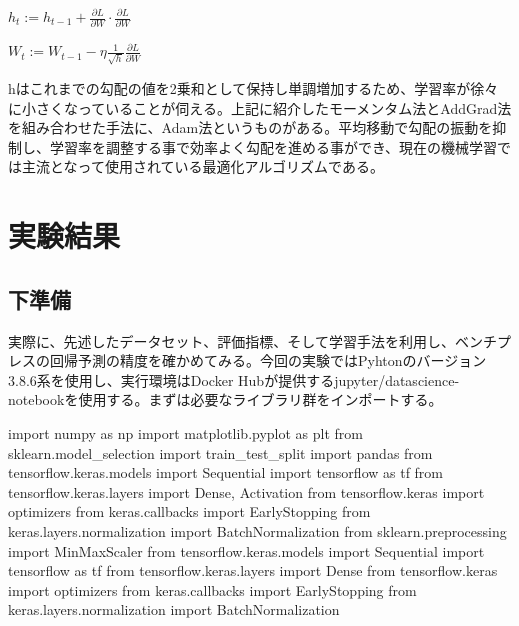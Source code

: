 \documentclass{report}
\begin{document}
\begin{center}
\begin{math}
h_t := h_{t-1} +  \frac{\partial L}{\partial W} \cdot \frac{\partial L}{\partial W}
\end{math}
\end{center}


\begin{center}
\begin{math}
W_t := W_{t-1} - \eta \frac{1}{\sqrt{h}} \frac{\partial L}{\partial W}
\end{math}
\end{center}

hはこれまでの勾配の値を2乗和として保持し単調増加するため、学習率が徐々に小さくなっていることが伺える。上記に紹介したモーメンタム法とAddGrad法を組み合わせた手法に、Adam法というものがある。平均移動で勾配の振動を抑制し、学習率を調整する事で効率よく勾配を進める事ができ、現在の機械学習では主流となって使用されている最適化アルゴリズムである。

\newpage
\section{実験結果}

\subsection{下準備}

実際に、先述したデータセット、評価指標、そして学習手法を利用し、ベンチプレスの回帰予測の精度を確かめてみる。今回の実験ではPyhtonのバージョン3.8.6系を使用し、実行環境はDocker Hubが提供するjupyter/datascience-notebookを使用する。まずは必要なライブラリ群をインポートする。
\\


\begin{python}[caption=必要なライブラリのインポート]
import numpy as np
import matplotlib.pyplot as plt
from sklearn.model_selection import train_test_split
import pandas
from tensorflow.keras.models import Sequential
import tensorflow as tf
from tensorflow.keras.layers import Dense, Activation
from tensorflow.keras import optimizers
from keras.callbacks import EarlyStopping
from keras.layers.normalization import BatchNormalization
from sklearn.preprocessing import MinMaxScaler
from tensorflow.keras.models import Sequential
import tensorflow as tf
from tensorflow.keras.layers import Dense
from tensorflow.keras import optimizers
from keras.callbacks import EarlyStopping
from keras.layers.normalization import BatchNormalization
\end{python}
\end{document}
